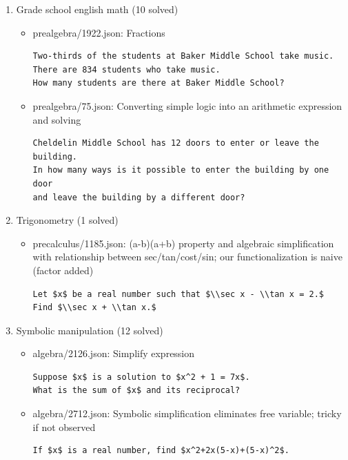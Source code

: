 \documentclass[11pt,a4paper]{article}
\begin{document}
\begin{enumerate}
  \item Grade school english math (10 solved)
    \begin{itemize}
      \item prealgebra/1922.json: Fractions
\begin{verbatim}
Two-thirds of the students at Baker Middle School take music.
There are 834 students who take music.
How many students are there at Baker Middle School?
\end{verbatim}
      \item prealgebra/75.json: Converting simple logic into an arithmetic expression and solving
\begin{verbatim}
Cheldelin Middle School has 12 doors to enter or leave the building.
In how many ways is it possible to enter the building by one door
and leave the building by a different door?
\end{verbatim}
    \end{itemize}

  \item Trigonometry (1 solved)
    \begin{itemize}
      \item precalculus/1185.json: (a-b)(a+b) property and algebraic simplification with relationship between sec/tan/cost/sin; our functionalization is naive (factor added)
\begin{verbatim}
Let $x$ be a real number such that $\\sec x - \\tan x = 2.$
Find $\\sec x + \\tan x.$
\end{verbatim}
    \end{itemize}

  \item Symbolic manipulation (12 solved)
    \begin{itemize}
      \item algebra/2126.json: Simplify expression
\begin{verbatim}
Suppose $x$ is a solution to $x^2 + 1 = 7x$.
What is the sum of $x$ and its reciprocal?
\end{verbatim}
      \item algebra/2712.json: Symbolic simplification eliminates free variable; tricky if not observed
\begin{verbatim}
If $x$ is a real number, find $x^2+2x(5-x)+(5-x)^2$.
\end{verbatim}
    \end{itemize}


\end{enumerate}
\end{document}
